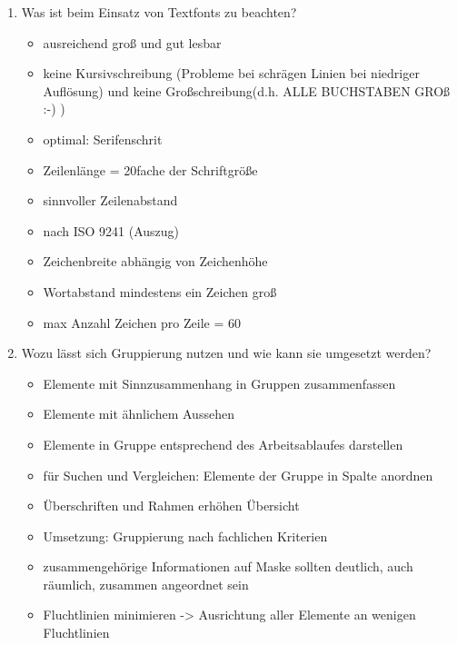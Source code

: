 \begin{enumerate}
	\item Was ist beim Einsatz von Textfonts zu beachten?
	\begin{itemize}
		\item ausreichend groß und gut lesbar
		\item keine Kursivschreibung (Probleme bei schrägen Linien bei niedriger Auflösung) und keine Großschreibung(d.h. ALLE BUCHSTABEN GROß :-) )
		\item optimal: Serifenschrit
		\item Zeilenlänge = 20fache der Schriftgröße
		\item sinnvoller Zeilenabstand
		\item nach ISO 9241 (Auszug)
		\item Zeichenbreite abhängig von Zeichenhöhe
		\item Wortabstand mindestens ein Zeichen groß
		\item max Anzahl Zeichen pro Zeile = 60
	\end{itemize}
	
	\item Wozu lässt sich Gruppierung nutzen und wie kann sie umgesetzt werden?
	\begin{itemize}
		\item Elemente mit Sinnzusammenhang in Gruppen zusammenfassen
		\item Elemente mit ähnlichem Aussehen
		\item Elemente in Gruppe entsprechend des Arbeitsablaufes darstellen
		\item für Suchen und Vergleichen: Elemente der Gruppe in Spalte anordnen
		\item Überschriften und Rahmen erhöhen Übersicht
		\item Umsetzung: Gruppierung nach fachlichen Kriterien
		\item zusammengehörige Informationen auf Maske sollten deutlich, auch räumlich, zusammen angeordnet sein
		\item Fluchtlinien minimieren -> Ausrichtung aller Elemente an wenigen Fluchtlinien
	\end{itemize}
\end{enumerate}